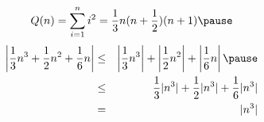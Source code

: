 \documentclass[30pt,landscape]{foils}
\begin{document}
\[
   Q(n) = \sum_{i=1}^{n}i^{2} =
         \frac{1}{3}n(n+\frac{1}{2})(n+1)\pause
\]
\begin{eqnarray*}
\left|\frac{1}{3}n^3 + \frac{1}{2}n^{2}+\frac{1}{6}n\right|
 &\leq&\left|\frac{1}{3}n^3\right|+\left|\frac{1}{2}n^{2}\right|+
          \left|\frac{1}{6}n\right|\pause\\
 &\leq&\frac{1}{3}|n^{3}|+\frac{1}{2}|n^{3}|+\frac{1}{6}|n^{3}|\\
 &=&|n^{3}|
\end{eqnarray*}
\end{document}
